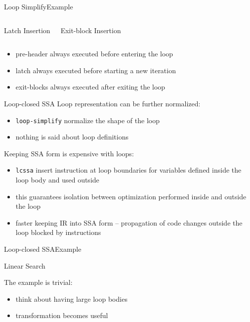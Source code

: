 \begin{frame}{Loop Simplify}{Example}
\begin{columns}[t]
\begin{block}{Latch Insertion}
\centering

\end{block}

\begin{block}{Exit-block Insertion}
\centering

\end{block}
\end{columns}

\begin{itemize}
\item pre-header always executed before entering the loop
\item latch always executed before starting a new iteration
\item exit-blocks always executed after exiting the loop
\end{itemize}
\end{frame}

\begin{frame}{Loop-closed SSA}
Loop representation can be further normalized:

\begin{itemize}
\item \texttt{loop-simplify} normalize the \alert{shape} of the loop
\item nothing is said about loop definitions
\end{itemize}

\vfill
Keeping SSA form is expensive with loops:

\begin{itemize}
\item \texttt{lcssa} insert  instruction at loop boundaries for
      variables \alert{defined inside} the loop body and \alert{used outside}
\item this guarantees isolation between optimization performed inside and outside
      the loop
\item faster keeping IR into SSA form -- propagation of code changes outside the
      loop blocked by  instructions
\end{itemize}
\end{frame}

\begin{frame}{Loop-closed SSA}{Example}
\begin{block}{Linear Search}
\centering
{}
\end{block}

\vfill
The example is trivial:

\begin{itemize}
\item think about having large loop bodies
\item transformation becomes useful
\end{itemize}
\end{frame}

